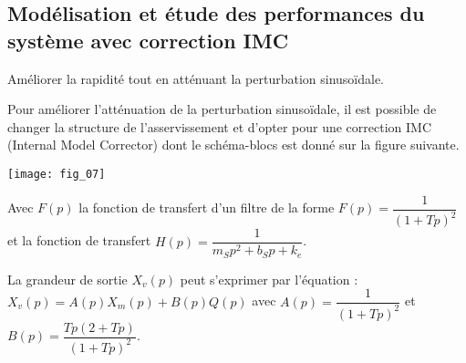 \begin{multicols}{2}
\subsection*{Modélisation et étude des performances du système avec correction IMC}

\begin{obj}
Améliorer la rapidité tout en atténuant la perturbation sinusoïdale.
\end{obj}

Pour améliorer l’atténuation de la perturbation sinusoïdale, il est possible de changer la
structure de l’asservissement et d’opter pour une correction IMC (Internal Model Corrector)
dont le schéma-blocs est donné sur la figure suivante.

\begin{center}
\texttt{[image: fig\_07]}
\end{center}

Avec $F(p)$ la fonction de transfert d’un filtre de la forme $F(p) = \dfrac{1}{\left(1+Tp\right)^2}$ et la fonction de
transfert $H(p) =\dfrac{1}{m_S p^2 + b_S p + k_e}$.



La grandeur de sortie $X_v(p)$ peut s’exprimer par l’équation : $X_v(p) = A(p)X_m(p) + B(p)Q(p)$ avec 
$A(p) = \dfrac{1}{\left(1+Tp\right)^2}$ et $B(p)=\dfrac{Tp\left(2+Tp \right)}{\left(1+Tp\right)^2}$.



\ifprof
\begin{corrige}
%
%
%
%
%
%


\end{corrige}
\end{multicols}

